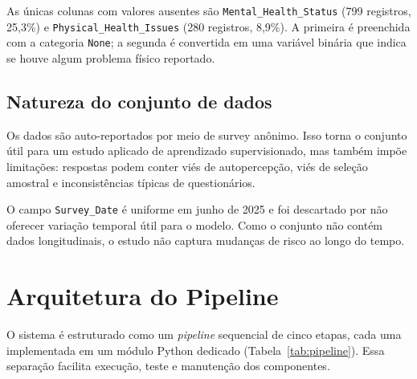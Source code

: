 \documentclass[conference]{IEEEtran}
\begin{document}
As únicas colunas com valores ausentes são
\texttt{Mental_Health_Status} (799 registros, 25,3\%) e
\texttt{Physical_Health_Issues} (280 registros, 8,9\%). A primeira é
preenchida com a categoria \texttt{None}; a segunda é convertida em uma
variável binária que indica se houve algum problema físico reportado.

\subsection{Natureza do conjunto de dados}

Os dados são auto-reportados por meio de survey anônimo. Isso torna o
conjunto útil para um estudo aplicado de aprendizado supervisionado, mas
também impõe limitações: respostas podem conter viés de autopercepção,
viés de seleção amostral e inconsistências típicas de questionários.

O campo \texttt{Survey_Date} é uniforme em junho de 2025 e foi descartado
por não oferecer variação temporal útil para o modelo. Como o conjunto não
contém dados longitudinais, o estudo não captura mudanças de risco ao longo
do tempo.

\section{Arquitetura do Pipeline}
\label{sec:pipeline}

O sistema é estruturado como um \textit{pipeline} sequencial de cinco etapas,
cada uma implementada em um módulo Python dedicado (Tabela~\ref{tab:pipeline}).
Essa separação facilita execução, teste e manutenção dos componentes.
\end{document}
